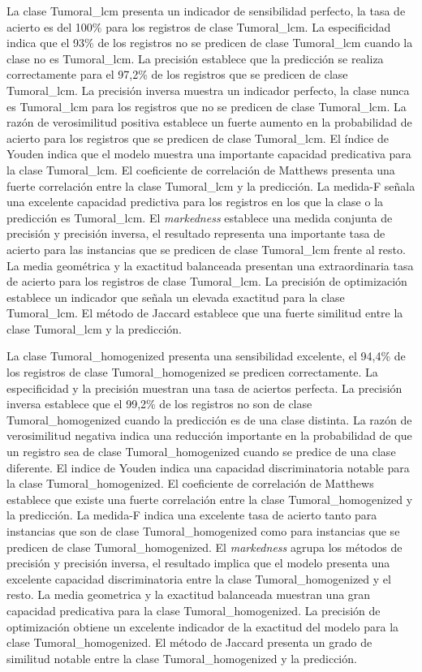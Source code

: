 \bigbreak

La clase Tumoral\_lcm presenta un indicador de sensibilidad perfecto, la tasa de acierto es del 100\% para los registros de clase Tumoral\_lcm. La especificidad indica que el 93\% de los registros no se predicen de clase Tumoral\_lcm cuando la clase no es Tumoral\_lcm. La precisión establece que la predicción se realiza correctamente para el 97,2\% de los registros que se predicen de clase Tumoral\_lcm. La precisión inversa muestra un indicador perfecto, la clase nunca es Tumoral\_lcm para los registros que no se predicen de clase Tumoral\_lcm. La razón de verosimilitud positiva establece un fuerte aumento en la probabilidad de acierto para los registros que se predicen de clase Tumoral\_lcm. El índice de Youden indica que el modelo muestra una importante capacidad predicativa para la clase Tumoral\_lcm. El coeficiente de correlación de Matthews presenta una fuerte correlación entre la clase Tumoral\_lcm y la predicción. La medida-F señala una excelente capacidad predictiva para los registros en los que la clase o la predicción es Tumoral\_lcm. El \textit{markedness} establece una medida conjunta de precisión y precisión inversa, el resultado representa una importante tasa de acierto para las instancias que se predicen de clase Tumoral\_lcm frente al resto. La media geométrica y la exactitud balanceada presentan una extraordinaria tasa de acierto para los registros de clase Tumoral\_lcm. La precisión de optimización establece un indicador que señala un elevada exactitud para la clase Tumoral\_lcm. El método de Jaccard establece que una fuerte similitud entre la clase Tumoral\_lcm y la predicción.

\bigbreak

La clase Tumoral\_homogenized presenta una sensibilidad excelente, el 94,4\% de los registros de clase Tumoral\_homogenized se predicen correctamente. La especificidad y la precisión muestran una tasa de aciertos perfecta. La precisión inversa establece que el 99,2\% de los registros no son de clase Tumoral\_homogenized cuando la predicción es de una clase distinta. La razón de verosimilitud negativa indica una reducción importante en la probabilidad de que un registro sea de clase Tumoral\_homogenized cuando se predice de una clase diferente. El indice de Youden indica una capacidad discriminatoria notable para la clase Tumoral\_homogenized. El coeficiente de correlación de Matthews establece que existe una fuerte correlación entre la clase Tumoral\_homogenized y la predicción. La medida-F indica una excelente tasa de acierto tanto para instancias que son de clase Tumoral\_homogenized como para instancias que se predicen de clase Tumoral\_homogenized. El \textit{markedness} agrupa los métodos de precisión y precisión inversa, el resultado implica que el modelo presenta una excelente capacidad discriminatoria entre la clase Tumoral\_homogenized y el resto. La media geometrica y la exactitud balanceada muestran una gran capacidad predicativa para la clase Tumoral\_homogenized. La precisión de optimización obtiene un excelente indicador de la exactitud del modelo para la clase Tumoral\_homogenized. El método de Jaccard presenta un grado de similitud notable entre la clase Tumoral\_homogenized y la predicción.


